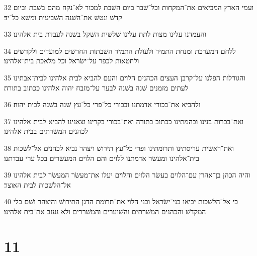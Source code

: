 \par 32 ועמי הארץ המביאים את־המקחות וכל־שׁבר ביום השׁבת למכור לא־נקח מהם בשׁבת וביום קדשׁ ונטשׁ את־השׁנה השׁביעית ומשׁא כל־יד׃
\par 33 והעמדנו עלינו מצות לתת עלינו שׁלשׁית השׁקל בשׁנה לעבדת בית אלהינו׃
\par 34 ללחם המערכת ומנחת התמיד ולעולת התמיד השׁבתות החדשׁים למועדים ולקדשׁים ולחטאות לכפר על־ישׂראל וכל מלאכת בית־אלהינו׃
\par 35 והגורלות הפלנו על־קרבן העצים הכהנים הלוים והעם להביא לבית אלהינו לבית־אבתינו לעתים מזמנים שׁנה בשׁנה לבער על־מזבח יהוה אלהינו ככתוב בתורה׃
\par 36 ולהביא את־בכורי אדמתנו ובכורי כל־פרי כל־עץ שׁנה בשׁנה לבית יהוה׃
\par 37 ואת־בכרות בנינו ובהמתינו ככתוב בתורה ואת־בכורי בקרינו וצאנינו להביא לבית אלהינו לכהנים המשׁרתים בבית אלהינו׃
\par 38 ואת־ראשׁית עריסתינו ותרומתינו ופרי כל־עץ תירושׁ ויצהר נביא לכהנים אל־לשׁכות בית־אלהינו ומעשׂר אדמתנו ללוים והם הלוים המעשׂרים בכל ערי עבדתנו׃
\par 39 והיה הכהן בן־אהרן עם־הלוים בעשׂר הלוים והלוים יעלו את־מעשׂר המעשׂר לבית אלהינו אל־הלשׁכות לבית האוצר׃
\par 40 כי אל־הלשׁכות יביאו בני־ישׂראל ובני הלוי את־תרומת הדגן התירושׁ והיצהר ושׁם כלי המקדשׁ והכהנים המשׁרתים והשׁוערים והמשׁררים ולא נעזב את־בית אלהינו׃

\chapter{11}

